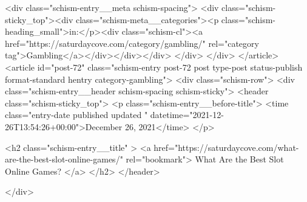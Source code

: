 {		<div class="schism-entry__meta schism-spacing">			<div class="schism-sticky_top"><div class="schism-meta__categories"><p class="schism-heading_small">in:</p><div class="schism-cl"><a href="https://saturdaycove.com/category/gambling/" rel="category tag">Gambling</a></div></div></div>		</div>
	</div>
</article>
<article id="post-72" class="schism-entry post-72 post type-post status-publish format-standard hentry category-gambling">
	<div class="schism-row">		<div class="schism-entry__header schism-spacing schism-sticky">			<header class="schism-sticky_top">				<p class="schism-entry__before-title">
					<time class="entry-date published updated " datetime="2021-12-26T13:54:26+00:00">December 26, 2021</time>				</p>

				<h2 class="schism-entry__title" >
					<a href="https://saturdaycove.com/what-are-the-best-slot-online-games/" rel="bookmark">
						What Are the Best Slot Online Games?					</a>
				</h2>
			</header>

					</div>

}
